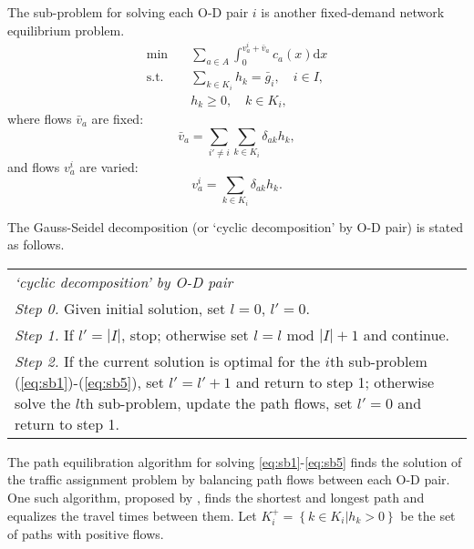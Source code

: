 The sub-problem for solving each O-D pair $i$ is another fixed-demand network equilibrium problem.
\begin{align} \label{eq:sb1}
    \min & \quad \sum_{a \in A} \int_0^{v_a^i + \bar{v}_a} c_a(x) \mathrm{d} x \\
    \text{s.t.} &\quad \sum_{k \in K_i} h_k = \bar{g}_i, \quad i \in I, \\
    & \quad h_k \geq 0, \quad k \in K_i,
\end{align}
where flows $\bar{v}_a$ are fixed:
\begin{equation}
    \bar{v}_a = \sum_{i' \neq i} \sum_{k \in K_i} \delta_{ak} h_k,
\end{equation}
and flows $v_a^i$ are varied:
\begin{equation} \label{eq:sb5}
    v_a^i = \sum_{k \in K_i} \delta_{ak} h_k.
\end{equation}

The Gauss-Seidel decomposition (or `cyclic decomposition' by O-D pair) is stated as follows.

\begin{table}[H]
    \begin{tabular}{ m{} }
        \hspace{-.5cm}\emph{`cyclic decomposition' by O-D pair \citep{Florian}} \\
        \emph{Step 0.} Given initial solution, set $l = 0$, $l' = 0$.\\
        \emph{Step 1.} If $l' = |I|$, stop; otherwise set $l = l \text{ mod } |I| + 1$ and continue.\\
        \emph{Step 2.} If the current solution is optimal for the $i$th sub-problem (\ref{eq:sb1})-(\ref{eq:sb5}), set $l' = l' + 1$ and return to step 1; otherwise solve the $l$th sub-problem, update the path flows, set $l' = 0$ and return to step 1.\\
    \end{tabular}
\end{table}

The path equilibration algorithm for solving \eqref{eq:sb1}-\eqref{eq:sb5} 
finds the solution of the traffic assignment problem by balancing path flows between each O-D pair.
One such algorithm, proposed by \citet{Dafermos}, 
finds the shortest and longest path and equalizes the travel times between them.
Let $K_i^{+} = \left\{ k \in K_i | h_k > 0 \right\}$ be the set of paths with positive flows.

